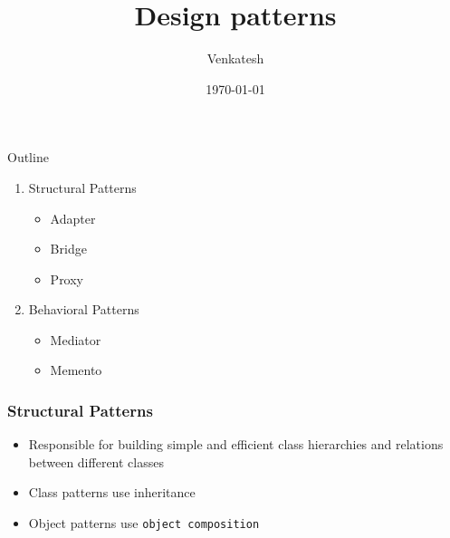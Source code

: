 \documentclass{beamer}
\title{Design patterns} %
\author{Venkatesh} %
\institute{WDC}
\date{\today} %
\begin{document}
\lstset{
    basicstyle=\ttfamily\footnotesize,
    breaklines=true
    breakatwhitespace=true,
    language=C++,
    columns=fullflexible,
    keepspaces=true,
    breaklines=true,
    tabsize=3, 
    showstringspaces=false,
    extendedchars=true
    inputencoding=utf8
}

\begin{frame}
\titlepage %
\end{frame}

\begin{frame}{Outline}
  \begin{enumerate}
   \item Structural Patterns
        \begin{itemize}
        \item Adapter
        \item Bridge
        \item Proxy
        \end{itemize}
   \item Behavioral Patterns
        \begin{itemize}
        \item Mediator
        \item Memento
        \end{itemize}
  \end{enumerate}
\end{frame}




\begin{frame}[fragile]
\frametitle{Structural Patterns}

\begin{itemize}
\item Responsible for building simple and efficient class hierarchies and relations between different classes
\item Class patterns use inheritance
\item Object patterns use \texttt{object composition}

\end{itemize}

\end{frame}
\end{document}

